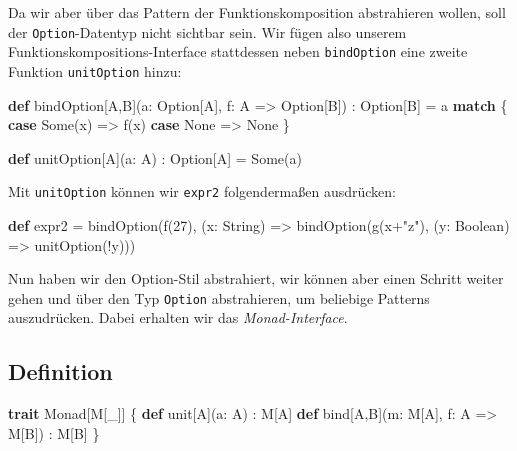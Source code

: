 \documentclass[]{article}
\newenvironment{Shaded}{}{}
\newcommand{\DataTypeTok}[1]{\textcolor[rgb]{0.56,0.13,0.00}{#1}}
\newcommand{\DecValTok}[1]{\textcolor[rgb]{0.25,0.63,0.44}{#1}}
\newcommand{\FunctionTok}[1]{\textcolor[rgb]{0.02,0.16,0.49}{#1}}
\newcommand{\KeywordTok}[1]{\textcolor[rgb]{0.00,0.44,0.13}{\textbf{#1}}}
\newcommand{\NormalTok}[1]{#1}
\newcommand{\StringTok}[1]{\textcolor[rgb]{0.25,0.44,0.63}{#1}}
\begin{document}
Da wir aber über das Pattern der Funktionskomposition abstrahieren
wollen, soll der \texttt{Option}-Datentyp nicht sichtbar sein. Wir fügen
also unserem Funktionskompositions-Interface stattdessen neben
\texttt{bindOption} eine zweite Funktion \texttt{unitOption} hinzu:

\begin{Shaded}
\begin{Highlighting}[]
\KeywordTok{def}\NormalTok{ bindOption[A,B](a: Option[A], f: A =\textgreater{} Option[B]) : Option[B] = a }\KeywordTok{match}\NormalTok{ \{}
  \KeywordTok{case}\NormalTok{ Some(x) =\textgreater{} }\FunctionTok{f}\NormalTok{(x)}
  \KeywordTok{case}\NormalTok{ None =\textgreater{} None}
\NormalTok{\}}

\KeywordTok{def}\NormalTok{ unitOption[A](a: A) : Option[A] = Some(a)}
\end{Highlighting}
\end{Shaded}

Mit \texttt{unitOption} können wir \texttt{expr2} folgendermaßen
ausdrücken:

\begin{Shaded}
\begin{Highlighting}[]
\KeywordTok{def}\NormalTok{ expr2 =}
  \FunctionTok{bindOption}\NormalTok{(}\FunctionTok{f}\NormalTok{(}\DecValTok{27}\NormalTok{), (x: String) =\textgreater{}}
    \FunctionTok{bindOption}\NormalTok{(}\FunctionTok{g}\NormalTok{(x+}\StringTok{"z"}\NormalTok{), (y: Boolean) =\textgreater{}}
      \FunctionTok{unitOption}\NormalTok{(!y)))}
\end{Highlighting}
\end{Shaded}

Nun haben wir den Option-Stil abstrahiert, wir können aber einen Schritt
weiter gehen und über den Typ \texttt{Option} abstrahieren, um beliebige
Patterns auszudrücken. Dabei erhalten wir das \emph{Monad-Interface}.

\hypertarget{definition}{%
\subsection{Definition}\label{definition}}

\begin{Shaded}
\begin{Highlighting}[]
\KeywordTok{trait}\NormalTok{ Monad[M[\_]] \{}
  \KeywordTok{def} \DataTypeTok{unit}\NormalTok{[A](a: A) : M[A]}
  \KeywordTok{def}\NormalTok{ bind[A,B](m: M[A], f: A =\textgreater{} M[B]) : M[B]}
\NormalTok{\}}
\end{Highlighting}
\end{Shaded}
\end{document}
